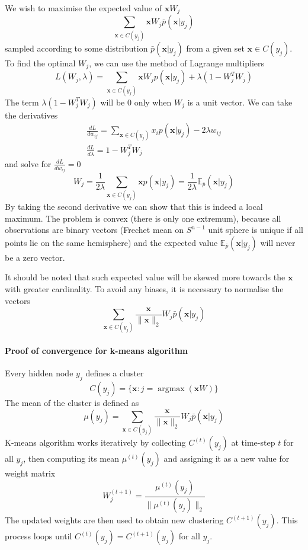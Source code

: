 \documentclass[12pt]{article}
\DeclareMathOperator*{\argmax}{argmax}
\begin{document}
We wish to maximise the expected value of $\boldsymbol{x}W_j$ 
\[
\sum_{\boldsymbol{x}\in C(y_j)} \boldsymbol{x} W_j \bar{p}(\boldsymbol{x}|y_j)
\]
sampled according to some distribution $\bar{p}(\boldsymbol{x}|y_j)$ from a given set $\boldsymbol{x}\in C(y_j)$.  To find the optimal $W_j$, we can use the method of Lagrange multipliers
\[
L(W_j,\lambda) = \sum_{\boldsymbol{x}\in C(y_j)} \boldsymbol{x} W_j p(\boldsymbol{x}|y_j) + \lambda(1- W_j^{T}W_j )
\]
The term $\lambda(1- W_j^{T}W_j)$ will be $0$ only when $W_j$ is a unit vector.
We can take the derivatives 
\begin{gather*}
	\frac{d L}{d w_{ij}} = \sum_{\boldsymbol{x}\in C(y_j)} x_i p(\boldsymbol{x}|y_j) - 2\lambda w_{ij} \\
	\frac{d L}{d \lambda} = 1 - W_j^{T}W_j
\end{gather*}
and solve for $\frac{d L}{d w_{ij}}=0$
\[
W_j = \frac{1}{2\lambda }\sum_{\boldsymbol{x}\in C(y_j)} \boldsymbol{x} p(\boldsymbol{x}|y_j)  = \frac{1}{2\lambda } \mathbb{E}_{\bar{p}}(\boldsymbol{x}|y_j)
\]
By taking the second derivative we can show that this is indeed a local maximum.
The problem is convex (there is only one extremum), because all observations are binary vectors (Frechet mean on $S^{n-1}$ unit sphere is unique if all points lie on the same hemisphere) and the expected value $\mathbb{E}_{\bar{p}}(\boldsymbol{x}|y_j)$ will never be a zero vector.

It should be noted that such expected value will be skewed more towards the $\boldsymbol{x}$ with greater cardinality. To avoid any biases, it is necessary to normalise the vectors 
\[
\sum_{\boldsymbol{x}\in C(y_j)} \frac{\boldsymbol{x}}{\lVert \boldsymbol{x} \rVert_2} W_j \bar{p}(\boldsymbol{x}|y_j)
\]



\paragraph{Proof of convergence for k-means algorithm} \label{par:l2_proof}
Every hidden node $y_j$ defines a cluster
\[
C(y_j) = \{\boldsymbol{x} : j=\argmax(\boldsymbol{x}W)\}
\]
The mean of the cluster is defined as
\[
\mu(y_j) = \sum_{\boldsymbol{x}\in C(y_j)} \frac{\boldsymbol{x}}{\lVert \boldsymbol{x} \rVert_2} W_j \bar{p}(\boldsymbol{x}|y_j)
\]
K-means algorithm works iteratively by collecting $C^{(t)}(y_j)$ at time-step $t$ for all $y_j$, then computing its mean $\mu^{(t)}(y_j)$ and assigning it as a new value for weight matrix
\[
W_j^{(t+1)} = \frac{\mu^{(t)}(y_j)}{\lVert \mu^{(t)}(y_j) \rVert_2}
\]
The updated weights are then used to obtain new clustering $C^{(t+1)}(y_j)$. This process loops until $C^{(t)}(y_j)=C^{(t+1)}(y_j)$ for all $y_j$. 
\end{document}
